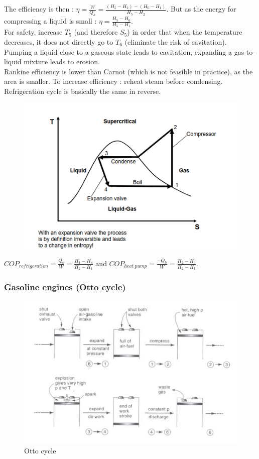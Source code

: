\documentclass[../main.tex]{subfiles}
\begin{document}
The efficiency is then : $\eta = \frac{W}{Q_h} = \frac{(H_5-H_2)-(H_6-H_1)}{H_5-H_2}$. But as the energy for compressing a liquid is small : $\eta = \frac{H_5-H_6}{H_5-H_1}$.\\
For safety, increase $T_5$ (and therefore $S_5$) in order that when the temperature decreases, it does not directly go to $T_6$ (eliminate the risk of cavitation).\\
Pumping a liquid close to a gaseous state leads to cavitation, expanding a gas-to-liquid mixture leads to erosion.\\
\warning Rankine efficiency is lower than Carnot (which is not feasible in practice), as the area is smaller. To increase efficiency : reheat steam before condensing. \\

Refrigeration cycle is basically the same in reverse. \\

\begin{figure}[hbt!]
    \centering
    \includegraphics[width=0.5\linewidth]{IMAGES/Renewable/Screenshot from 2025-02-25 16-53-25.png}
\end{figure}

$COP_{refrigeration} = \frac{Q_c}{W} = \frac{H_1-H_4}{H_2-H_1}$ and $COP_{heat\: pump} = \frac{-Q_h}{W} = \frac{H_2-H_3}{H_2-H_1}$.\\

\subsubsection{Gasoline engines (Otto cycle)}
\begin{figure}[hbt!]
    \centering
    \includegraphics[width=0.5\linewidth]{IMAGES/Renewable/Screenshot from 2025-03-04 15-18-26.png}
    \caption{Otto cycle}
\end{figure}
\end{document}
